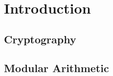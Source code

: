 \section{Introduction} %
\label{sec:introduction}

\subsection{Cryptography} %
\label{sub:cryptography}


\subsection{Modular Arithmetic} %
\label{sub:hill_ciphers}




